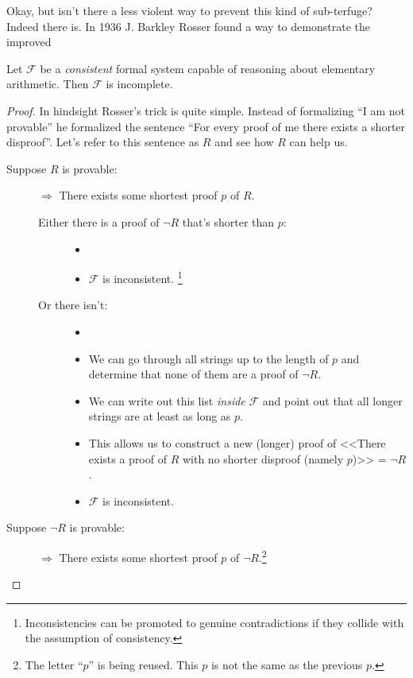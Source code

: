 \documentclass{article}
\theoremstyle{customstyle}
\newcommand{\F}{\ensuremath{\mathcal{F}}}
\begin{document}
Okay, but isn't there a less violent way to prevent this kind of sub-terfuge? Indeed there is. In 1936 J. Barkley Rosser found a way to demonstrate the improved

\begin{theorem}
Let $\F$ be a \textit{consistent} formal system capable of reasoning about elementary arithmetic. Then $\F$ is incomplete.
\end{theorem}

\begin{proof}
In hindsight Rosser's trick is quite simple. Instead of formalizing ``I am not provable'' he formalized the sentence ``For every proof of me there exists a shorter disproof''. Let's refer to this sentence as $R$ and see how $R$ can help us.
\begin{description}
\item[Suppose $R$ is provable:]
$\Rightarrow$ There exists some shortest proof $p$ of $R$.
\begin{description}
\item[Either there is a proof of $\neg R$ that's shorter than $p$:]
\begin{itemize}
\item[]
\item $\F$ is inconsistent. \lightning\footnote{Inconsistencies can be promoted to genuine contradictions if they collide with the assumption of consistency.}
\end{itemize}
\item[Or there isn't:]
\begin{itemize}
\item[]
\item We can go through all strings up to the length of $p$ and determine that none of them are a proof of $\neg R$.
\item We can write out this list \textit{inside} $\F$ and point out that all longer strings are at least as long as $p$.
\item This allows us to construct a new (longer) proof of <<There exists a proof of $R$ with no shorter disproof (namely $p$)>> = $\neg R$.
\item $\F$ is inconsistent. \lightning
\end{itemize}
\end{description}
\item[Suppose $\neg R$ is provable:]
$\Rightarrow$ There exists some shortest proof $p$ of $\neg R$.\footnote{The letter ``$p$'' is being reused. This $p$ is not the same as the previous $p$.}

\end{description}
\end{proof}
\end{document}
